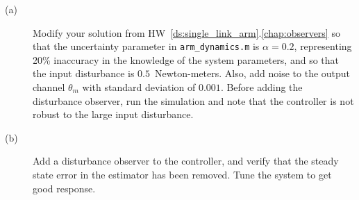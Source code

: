 \begin{description}
\item[(a)] Modify your solution from HW~\ref{ds:single_link_arm}.\ref{chap:observers} so that the uncertainty parameter in {\tt  arm\_dynamics.m} is $\alpha=0.2$, representing 20\% inaccuracy in the knowledge of the system parameters, and so that the input disturbance is $0.5$~Newton-meters. Also, add noise to the output channel $\theta_m$ with standard deviation of $0.001$.  Before adding the disturbance observer, run the simulation and note that the controller is not robust to the large input disturbance.
\item[(b)] Add a disturbance observer to the controller, and verify that the steady state error in the estimator has been removed.  Tune the system to get good response.
\end{description}
